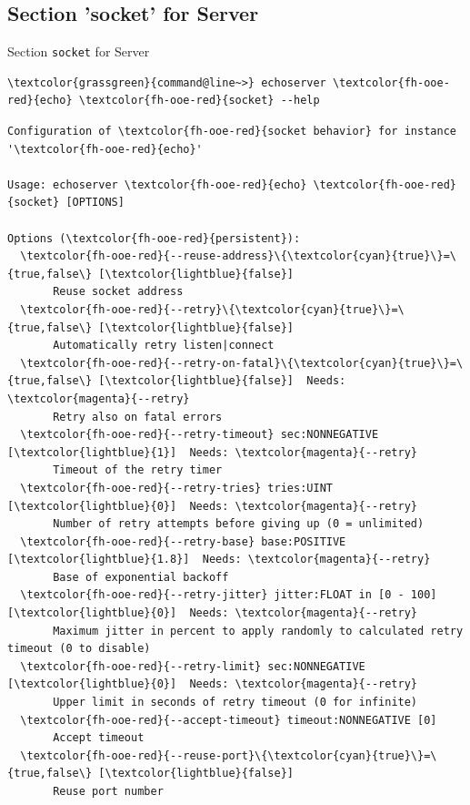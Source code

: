 \subsection{Section 'socket' for Server}

\begin{frame}[fragile]{Section \alert{\lstinline|socket|} for Server}
\begin{scriptsize}
\begin{Verbatim}[commandchars=\\\{\}]
\textcolor{grassgreen}{command@line~>} echoserver \textcolor{fh-ooe-red}{echo} \textcolor{fh-ooe-red}{socket} --help
\end{Verbatim}
\begin{Verbatim}[commandchars=\\\{\},frame=leftline]
Configuration of \textcolor{fh-ooe-red}{socket behavior} for instance '\textcolor{fh-ooe-red}{echo}'

Usage: echoserver \textcolor{fh-ooe-red}{echo} \textcolor{fh-ooe-red}{socket} [OPTIONS]

Options (\textcolor{fh-ooe-red}{persistent}):
  \textcolor{fh-ooe-red}{--reuse-address}\{\textcolor{cyan}{true}\}=\{true,false\} [\textcolor{lightblue}{false}]
       Reuse socket address
  \textcolor{fh-ooe-red}{--retry}\{\textcolor{cyan}{true}\}=\{true,false\} [\textcolor{lightblue}{false}]
       Automatically retry listen|connect
  \textcolor{fh-ooe-red}{--retry-on-fatal}\{\textcolor{cyan}{true}\}=\{true,false\} [\textcolor{lightblue}{false}]  Needs: \textcolor{magenta}{--retry}
       Retry also on fatal errors
  \textcolor{fh-ooe-red}{--retry-timeout} sec:NONNEGATIVE [\textcolor{lightblue}{1}]  Needs: \textcolor{magenta}{--retry}
       Timeout of the retry timer
  \textcolor{fh-ooe-red}{--retry-tries} tries:UINT [\textcolor{lightblue}{0}]  Needs: \textcolor{magenta}{--retry}
       Number of retry attempts before giving up (0 = unlimited)
  \textcolor{fh-ooe-red}{--retry-base} base:POSITIVE [\textcolor{lightblue}{1.8}]  Needs: \textcolor{magenta}{--retry}
       Base of exponential backoff
  \textcolor{fh-ooe-red}{--retry-jitter} jitter:FLOAT in [0 - 100] [\textcolor{lightblue}{0}]  Needs: \textcolor{magenta}{--retry}
       Maximum jitter in percent to apply randomly to calculated retry timeout (0 to disable)
  \textcolor{fh-ooe-red}{--retry-limit} sec:NONNEGATIVE [\textcolor{lightblue}{0}]  Needs: \textcolor{magenta}{--retry}
       Upper limit in seconds of retry timeout (0 for infinite)
  \textcolor{fh-ooe-red}{--accept-timeout} timeout:NONNEGATIVE [0]
       Accept timeout
  \textcolor{fh-ooe-red}{--reuse-port}\{\textcolor{cyan}{true}\}=\{true,false\} [\textcolor{lightblue}{false}]
       Reuse port number
\end{Verbatim}
\end{scriptsize}
\end{frame}
